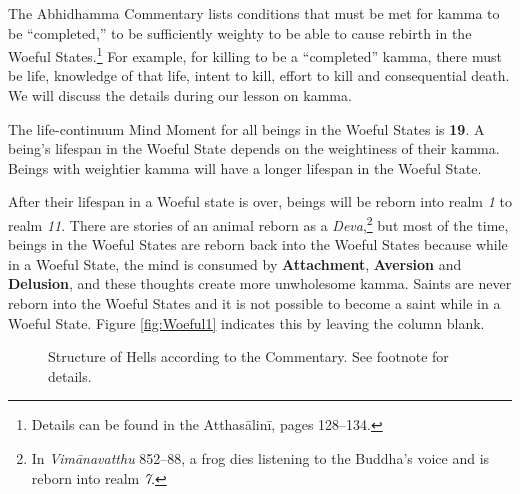 The Abhidhamma Commentary lists conditions that must be met for kamma to be “completed,” to be sufficiently weighty to be able to cause rebirth in the Woeful States.\footnote{Details can be found in the Atthasālinī, pages 128--134.} For example, for killing to be a “completed” kamma, there must be life, knowledge of that life, intent to kill, effort to kill and consequential death. We will discuss the details during our lesson on kamma.

The life-continuum Mind Moment for all beings in the Woeful States is \textbf{19}. A being’s lifespan in the Woeful State depends on the weightiness of their kamma. Beings with weightier kamma will have a longer lifespan in the Woeful State. 

After their lifespan in a Woeful state is over, beings will be reborn into realm \textit{1} to realm \textit{11}. There are stories of an animal reborn as a \textit{Deva},\footnote{In \textit{Vimānavatthu} 852--88, a frog dies listening to the Buddha’s voice and is reborn into realm \textit{7}.} but most of the time, beings in the Woeful States are reborn back into the Woeful States because while in a Woeful State, the mind is consumed by \textbf{Attachment}, \textbf{Aversion} and \textbf{Delusion}, and these thoughts create more unwholesome kamma. Saints are never reborn into the Woeful States and it is not possible to become a saint while in a Woeful State. Figure \ref{fig:Woeful1} indicates this by leaving the column blank.

\pagebreak

\begin{figure}[H]
\centering
\vspace{2mm}

\caption{Structure of Hells according to the Commentary. See footnote for details.}
\label{fig:Hells}
\end{figure}

